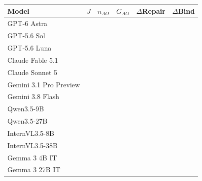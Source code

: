 \begin{tabular}{@{}lrrrrr@{}}
\toprule
Model & $J$ & $n_{AO}$ & $G_{AO}$ & $\Delta$Repair & $\Delta$Bind\\
\midrule
GPT-6 Astra &  &  &  &  & \\
GPT-5.6 Sol &  &  &  &  & \\
GPT-5.6 Luna &  &  &  &  & \\
Claude Fable 5.1 &  &  &  &  & \\
Claude Sonnet 5 &  &  &  &  & \\
Gemini 3.1 Pro Preview &  &  &  &  & \\
Gemini 3.8 Flash &  &  &  &  & \\
Qwen3.5-9B &  &  &  &  & \\
Qwen3.5-27B &  &  &  &  & \\
InternVL3.5-8B &  &  &  &  & \\
InternVL3.5-38B &  &  &  &  & \\
Gemma 3 4B IT &  &  &  &  & \\
Gemma 3 27B IT &  &  &  &  & \\
\bottomrule
\end{tabular}
